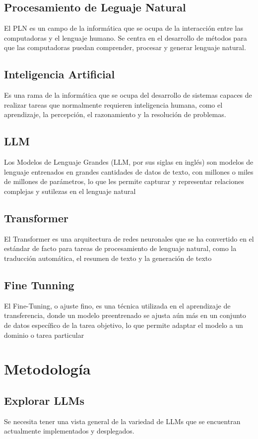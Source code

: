 \documentclass[journal,onecolumn]{IEEEtran}
\begin{document}
	\subsection{Procesamiento de Leguaje Natural}
	El PLN es un campo de la informática que se ocupa de la interacción entre las computadoras y el lenguaje humano. Se centra en el desarrollo de métodos para que las computadoras puedan comprender, procesar y generar lenguaje natural.
	\subsection{Inteligencia Artificial}
	Es una rama de la informática que se ocupa del desarrollo de sistemas capaces de realizar tareas que normalmente requieren inteligencia humana, como el aprendizaje, la percepción, el razonamiento y la resolución de problemas. 
	\subsection{LLM}
	Los Modelos de Lenguaje Grandes (LLM, por sus siglas en inglés) son modelos de lenguaje entrenados en grandes cantidades de datos de texto, con millones o miles de millones de parámetros, lo que les permite capturar y representar relaciones complejas y sutilezas en el lenguaje natural
	\subsection{Transformer}
	El Transformer es una arquitectura de redes neuronales que se ha convertido en el estándar de facto para tareas de procesamiento de lenguaje natural, como la traducción automática, el resumen de texto y la generación de texto
	\subsection{Fine Tunning}
	El Fine-Tuning, o ajuste fino, es una técnica utilizada en el aprendizaje de transferencia, donde un modelo preentrenado se ajusta aún más en un conjunto de datos específico de la tarea objetivo, lo que permite adaptar el modelo a un dominio o tarea particular
	\section{Metodología}
	\subsection{Explorar LLMs}
	Se necesita tener una vista general de la variedad de LLMs que se encuentran actualmente implementados y desplegados.
\end{document}
